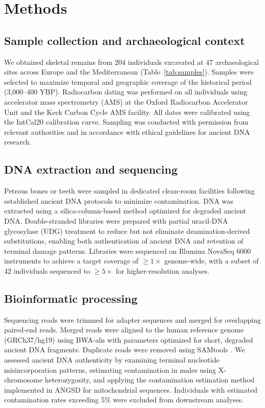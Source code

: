 \documentclass[11pt,a4paper]{article}
\begin{document}
\section{Methods}

\subsection{Sample collection and archaeological context}
We obtained skeletal remains from 204 individuals excavated at 47 archaeological sites across Europe and the Mediterranean (Table~\ref{tab:samples}). Samples were selected to maximize temporal and geographic coverage of the historical period (3,000--400 YBP). Radiocarbon dating was performed on all individuals using accelerator mass spectrometry (AMS) at the Oxford Radiocarbon Accelerator Unit and the Keck Carbon Cycle AMS facility. All dates were calibrated using the IntCal20 calibration curve. Sampling was conducted with permission from relevant authorities and in accordance with ethical guidelines for ancient DNA research.

\subsection{DNA extraction and sequencing}
Petrous bones or teeth were sampled in dedicated clean-room facilities following established ancient DNA protocols to minimize contamination. DNA was extracted using a silica-column-based method optimized for degraded ancient DNA. Double-stranded libraries were prepared with partial uracil-DNA glycosylase (UDG) treatment to reduce but not eliminate deamination-derived substitutions, enabling both authentication of ancient DNA and retention of terminal damage patterns. Libraries were sequenced on Illumina NovaSeq 6000 instruments to achieve a target coverage of $\geq 1\times$ genome-wide, with a subset of 42 individuals sequenced to $\geq 5\times$ for higher-resolution analyses.

\subsection{Bioinformatic processing}
Sequencing reads were trimmed for adapter sequences and merged for overlapping paired-end reads. Merged reads were aligned to the human reference genome (GRCh37/hg19) using BWA-aln with parameters optimized for short, degraded ancient DNA fragments. Duplicate reads were removed using SAMtools \citep{li2009sequence}. We assessed ancient DNA authenticity by examining terminal nucleotide misincorporation patterns, estimating contamination in males using X-chromosome heterozygosity, and applying the contamination estimation method implemented in ANGSD for mitochondrial sequences. Individuals with estimated contamination rates exceeding 5\% were excluded from downstream analyses.
\end{document}
